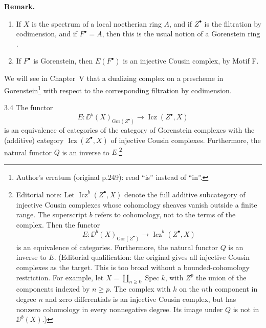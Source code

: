\par\medskip\noindent\textbf{Remark.}
\begin{enumerate}
\item If $X$ is the spectrum of a local noetherian ring $A$, and if $Z^\bullet$ is the filtration by codimension, and if $F^\bullet=A$, then this is the usual notion of a Gorenstein ring \cite[ and Exercise~2 ff.]{LC}.
\item If $F^\bullet$ is Gorenstein, then $E(F^\bullet)$ is an injective Cousin complex, by Motif F.
\end{enumerate}
\par\medskip

\begin{example*}
We will see in Chapter~V that a dualizing complex on a prescheme in Gorenstein\footnote{Author's erratum (original p.249): read ``is'' instead of ``in''.} with respect to the corresponding filtration by codimension.
\end{example*}

\begin{bookproposition}{3.4}\label{prop:4.3.4}
The functor
\[
E\colon \DD^b(X)_{\mathrm{Gor}(Z^\bullet)}\longrightarrow \operatorname{Icz}(Z^\bullet,X)
\]
is an equivalence of categories of the category of Gorenstein complexes with the (additive) category $\operatorname{Icz}(Z^\bullet,X)$ of injective Cousin complexes. Furthermore, the natural functor $Q$ is an inverse to $E$.\footnote{Editorial note: Let $\operatorname{Icz}^{b}(Z^\bullet,X)$ denote the full additive subcategory of injective Cousin complexes whose cohomology sheaves vanish outside a finite range. The superscript $b$ refers to cohomology, not to the terms of the complex. Then the functor
\[
E\colon \DD^b(X)_{\mathrm{Gor}(Z^\bullet)}
 \longrightarrow \operatorname{Icz}^{b}(Z^\bullet,X)
\]
is an equivalence of categories. Furthermore, the natural functor $Q$ is an inverse to $E$. (Editorial qualification: the original gives all injective Cousin complexes as the target. This is too broad without a bounded-cohomology restriction. For example, let $X=\coprod_{n\geq0}\operatorname{Spec}k$, with $Z^p$ the union of the components indexed by $n\geq p$. The complex with $k$ on the $n$th component in degree $n$ and zero differentials is an injective Cousin complex, but has nonzero cohomology in every nonnegative degree. Its image under $Q$ is not in $\DD^b(X)$.)}
\end{bookproposition}

